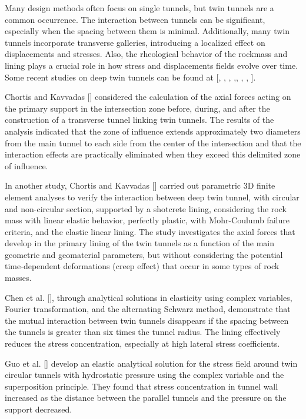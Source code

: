 \documentclass[a4paper,fleqn]{cas-sc}
\begin{document}
Many design methods often focus on single tunnels, but twin tunnels are a common occurrence. The interaction between tunnels can be significant, especially when the spacing between them is minimal. Additionally, many twin tunnels incorporate transverse galleries, introducing a localized effect on displacements and stresses. Also, the rheological behavior of the rockmass and lining plays a crucial role in how stress and displacements fields evolve over time. Some recent studies on deep twin tunnels can be found at [, , , ,, , , ].

Chortis and Kavvadas [] considered the calculation of the axial forces acting on the primary support in the intersection zone before, during, and after the construction of a transverse tunnel linking twin tunnels. The results of the analysis indicated that the zone of influence extends approximately two diameters from the main tunnel to each side from the center of the intersection and that the interaction effects are practically eliminated when they exceed this delimited zone of influence. 

In another study, Chortis and Kavvadas [] carried out parametric 3D finite element analyses to verify the interaction between deep twin tunnel, with circular and non-circular section, supported by a shotcrete lining, considering the rock mass with linear elastic behavior, perfectly plastic, with Mohr-Coulumb failure criteria, and the elastic linear lining. The study investigates the axial forces that develop in the primary lining of the twin tunnels as a function of the main geometric and geomaterial parameters, but without considering the potential time-dependent deformations (creep effect) that occur in some types of rock masses.

Chen et al. [], through analytical solutions in elasticity using complex variables, Fourier transformation, and the alternating Schwarz method, demonstrate that the mutual interaction between twin tunnels disappears if the spacing between the tunnels is greater than six times the tunnel radius. The lining effectively reduces the stress concentration, especially at high lateral stress coefficients.

Guo et al. [] develop an elastic analytical solution for the stress field around twin circular tunnels with hydrostatic pressure using the complex variable and the superposition principle. They found that stress concentration in tunnel wall increased as the distance between the parallel tunnels and the pressure on the support decreased.
\end{document}
